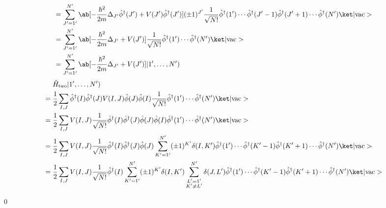 \documentclass[uplatex,dvipdfmx,a4paper,11pt]{jlreq}
\makeatletter
\numberwithin{equation}{section}
\theoremstyle{definition}
\renewenvironment{proof}[1][\proofname]{\par
  \normalfont
  \topsep6\p@\@plus6\p@ \trivlist
  \item[\hskip\labelsep{\bfseries #1}\@addpunct{\bfseries}]\ignorespaces\quad\par
}{
  \qed\endtrivlist\@endpefalse
}
\renewcommand\proofname{証明}
\makeatother
\begin{document}
\begin{proof}
\begin{align}
     & = \sum_{J' = 1'}^{N'}\ab[-\frac{\hbar^2}{2m}\Delta_{J'}\hat{\phi}^\dagger(J') + V(J')\hat{\phi}^\dagger(J')](\pm 1)^{J'}\frac{1}{\sqrt{N!}}\hat{\phi}^\dagger(1')\cdots\hat{\phi}^\dagger(J'-1)\hat{\phi}^\dagger(J'+1)\cdots\hat{\phi}^\dagger(N')\ket|\mathrm{vac}>                                     \\
     & = \sum_{J' = 1'}^{N'}\ab[-\frac{\hbar^2}{2m}\Delta_{J'} + V(J')]\frac{1}{\sqrt{N!}}\hat{\phi}^\dagger(1')\cdots\hat{\phi}^\dagger(N')\ket|\mathrm{vac}>                                                                                                                                                   \\
     & = \sum_{J' = 1'}^{N'}\ab[-\frac{\hbar^2}{2m}\Delta_{J'} + V(J')]|1',\ldots,N')
  \end{align}
  \begin{align}
     & \quad\ \hat{H}_{\mathrm{two}}|1',\ldots,N')                                                                                                                                                                                                                                        \\
     & = \frac{1}{2}\sum_{I,J}\hat{\phi}^\dagger(I)\hat{\phi}^\dagger(J)V(I, J)\hat{\phi}(J)\hat{\phi}(I)\frac{1}{\sqrt{N!}}\hat{\phi}^\dagger(1')\cdots\hat{\phi}^\dagger(N')\ket|\mathrm{vac}>                                                                                          \\
     & = \frac{1}{2}\sum_{I,J}V(I, J)\frac{1}{\sqrt{N!}}\hat{\phi}^\dagger(I)\hat{\phi}^\dagger(J)\hat{\phi}(J)\hat{\phi}(I)\hat{\phi}^\dagger(1')\cdots\hat{\phi}^\dagger(N')\ket|\mathrm{vac}>                                                                                          \\
     & = \frac{1}{2}\sum_{I,J}V(I, J)\frac{1}{\sqrt{N!}}\hat{\phi}^\dagger(I)\hat{\phi}^\dagger(J)\hat{\phi}(J)\sum_{K' = 1'}^{N'}(\pm 1)^{K'}\delta(I, K')\hat{\phi}^\dagger(1')\cdots\hat{\phi}^\dagger(K' - 1)\hat{\phi}^\dagger(K' + 1)\cdots\hat{\phi}^\dagger(N')\ket|\mathrm{vac}> \\
     & = \frac{1}{2}\sum_{I,J}V(I, J)\frac{1}{\sqrt{N!}}\hat{\phi}^\dagger(I)\sum_{K' = 1'}^{N'}(\pm 1)^{K'}\delta(I, K')\sum_{\substack{L' = 1'                                                                                                                                          \\ K' \neq L'}}^{N'}\delta(J, L')\hat{\phi}^\dagger(1')\cdots\hat{\phi}^\dagger(K' - 1)\hat{\phi}^\dagger(K' + 1)\cdots\hat{\phi}^\dagger(N')\ket|\mathrm{vac}>                                                                                                                                              \\

\end{align}
\end{proof}
\end{document}
